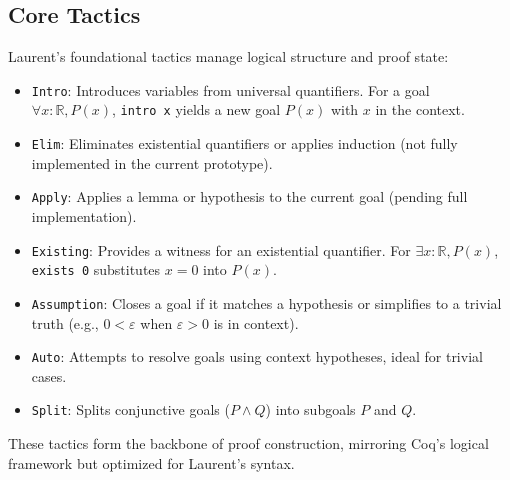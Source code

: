 \documentclass[12pt,twoside,draft]{cmpart}
\begin{document}
\subsection{Core Tactics}
Laurent’s foundational tactics manage logical structure and proof state:
\begin{itemize}
\item \texttt{Intro}: Introduces variables from universal quantifiers. For a goal $\forall x : \mathbb{R}, P(x)$, \texttt{intro x} yields a new goal $P(x)$ with $x$ in the context.
\item \texttt{Elim}: Eliminates existential quantifiers or applies induction (not fully implemented in the current prototype).
\item \texttt{Apply}: Applies a lemma or hypothesis to the current goal (pending full implementation).
\item \texttt{Existing}: Provides a witness for an existential quantifier. For $\exists x : \mathbb{R}, P(x)$, \texttt{exists 0} substitutes $x = 0$ into $P(x)$.
\item \texttt{Assumption}: Closes a goal if it matches a hypothesis or simplifies to a trivial truth (e.g., $0 < \varepsilon$ when $\varepsilon > 0$ is in context).
\item \texttt{Auto}: Attempts to resolve goals using context hypotheses, ideal for trivial cases.
\item \texttt{Split}: Splits conjunctive goals ($P \land Q$) into subgoals $P$ and $Q$.
\end{itemize}
These tactics form the backbone of proof construction, mirroring Coq’s logical framework but optimized for Laurent’s syntax.
\end{document}
